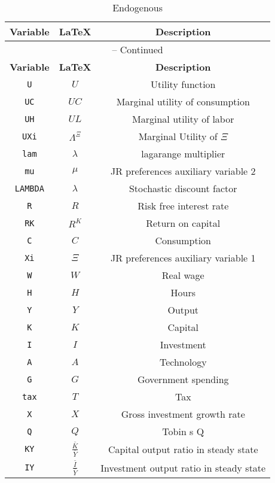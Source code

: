 \begin{center}
\begin{longtable}{ccc}
\caption{Endogenous}\\%
\hline%
\multicolumn{1}{c}{\textbf{Variable}} &
\multicolumn{1}{c}{\textbf{\LaTeX}} &
\multicolumn{1}{c}{\textbf{Description}}\\%
\hline\hline%
\endfirsthead
\multicolumn{3}{c}{{\tablename} \thetable{} -- Continued}\\%
\hline%
\multicolumn{1}{c}{\textbf{Variable}} &
\multicolumn{1}{c}{\textbf{\LaTeX}} &
\multicolumn{1}{c}{\textbf{Description}}\\%
\hline\hline%
\endhead
\texttt{U} & $U$ & Utility function\\
\texttt{UC} & $UC$ & Marginal utility of consumption\\
\texttt{UH} & $UL$ & Marginal utility of labor\\
\texttt{UXi} & ${\Lambda^{\Xi}}$ & Marginal Utility of $\Xi$\\
\texttt{lam} & ${\lambda}$ & lagarange multiplier\\
\texttt{mu} & ${\mu}$ & JR preferences auxiliary variable 2\\
\texttt{LAMBDA} & $\lambda$ & Stochastic discount factor\\
\texttt{R} & $R$ & Risk free interest rate\\
\texttt{RK} & $R^{K}$ & Return on capital\\
\texttt{C} & $C$ & Consumption\\
\texttt{Xi} & ${\Xi}$ & JR preferences auxiliary variable 1\\
\texttt{W} & $W$ & Real wage\\
\texttt{H} & $H$ & Hours\\
\texttt{Y} & $Y$ & Output\\
\texttt{K} & $K$ & Capital\\
\texttt{I} & $I$ & Investment\\
\texttt{A} & $A$ & Technology\\
\texttt{G} & $G$ & Government spending\\
\texttt{tax} & $T$ & Tax\\
\texttt{X} & $X$ & Gross investment growth rate\\
\texttt{Q} & $Q$ & Tobin s Q\\
\texttt{KY} & $\frac{\bar{K}}{\bar{Y}}$ & Capital output ratio in steady state\\
\texttt{IY} & $\frac{\bar{I}}{\bar{Y}}$ & Investment output ratio in steady state\\

\end{longtable}
\end{center}
